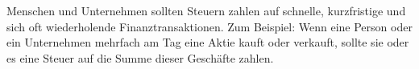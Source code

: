 Menschen und Unternehmen sollten Steuern zahlen auf schnelle, kurzfristige und sich oft wiederholende Finanztransaktionen.
Zum Beispiel: Wenn eine Person oder ein Unternehmen mehrfach am Tag eine Aktie kauft oder verkauft, sollte sie oder es eine Steuer auf die Summe dieser Geschäfte zahlen.